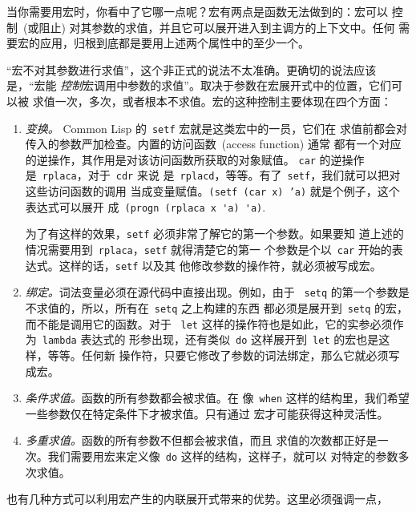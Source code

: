 当你需要用宏时，你看中了它哪一点呢？宏有两点是函数无法做到的：宏可以
控制~(或阻止) 对其参数的求值，并且它可以展开进入到主调方的上下文中。任何
需要宏的应用，归根到底都是要用上述两个属性中的至少一个。

``宏不对其参数进行求值''，这个非正式的说法不太准确。更确切的说法应该是，``宏能
\emph{控制}宏调用中参数的求值''。取决于参数在宏展开式中的位置，它们可以被
求值一次，多次，或者根本不求值。宏的这种控制主要体现在四个方面：

\begin{enumerate}

\item \emph{变换。}  Common Lisp 的~\texttt{setf} 宏就是这类宏中的一员，它们在
  求值前都会对传入的参数严加检查。内置的访问函数~(access function) 通常
  都有一个对应的逆操作，其作用是对该访问函数所获取的对象赋值。
  \texttt{car} 的逆操作是~\texttt{rplaca}，对于~\texttt{cdr} 来说
  是~\texttt{rplacd}，等等。有了~\verb|setf|，我们就可以把对这些访问函数的调用
  当成变量赋值。\texttt{(setf (car x) 'a)} 就是个例子，这个表达式可以展开
  成~\verb|(progn (rplaca x 'a) 'a)|.

  为了有这样的效果，\verb|setf| 必须非常了解它的第一个参数。如果要知
道上述的情况需要用到~\verb|rplaca|，\verb|setf| 就得清楚它的第一
个参数是个以~\verb|car| 开始的表达式。这样的话，\verb|setf| 以及其
他修改参数的操作符，就必须被写成宏。

\item \emph{绑定。}词法变量必须在源代码中直接出现。例如，由于
  ~\verb|setq| 的第一个参数是不求值的，所以，所有在~\verb|setq| 之上构建的东西
  都必须是展开到~\texttt{setq} 的宏，而不能是调用它的函数。对于
  ~\texttt{let} 这样的操作符也是如此，它的实参必须作为~\texttt{lambda} 表达式的
  形参出现，还有类似~\texttt{do} 这样展开到~\texttt{let} 的宏也是这样，等等。任何新
  操作符，只要它修改了参数的词法绑定，那么它就必须写成宏。

\item \emph{条件求值。}函数的所有参数都会被求值。在
  像~\verb|when| 这样的结构里，我们希望一些参数仅在特定条件下才被求值。只有通过
  宏才可能获得这种灵活性。

\item \emph{多重求值。}函数的所有参数不但都会被求值，而且
  求值的次数都正好是一次。我们需要用宏来定义像~\verb|do| 这样的结构，这样子，就可以
  对特定的参数多次求值。
\end{enumerate}
也有几种方式可以利用宏产生的内联展开式带来的优势。这里必须强调一点，

